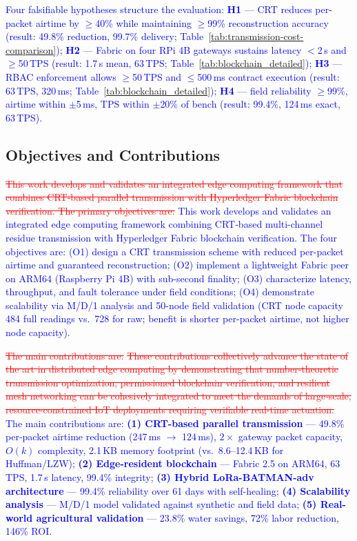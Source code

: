 \documentclass[pdflatex,sn-mathphys-num]{sn-jnl}
\theoremstyle{thmstyleone}
\theoremstyle{thmstyletwo}
\theoremstyle{thmstylethree}
\begin{document}
{\textcolor{blue}{Four falsifiable hypotheses structure the evaluation: \textbf{H1} — CRT reduces per-packet airtime by $\geq$40\% while maintaining $\geq$99\% reconstruction accuracy (result: 49.8\% reduction, 99.7\% delivery; Table~\ref{tab:transmission-cost-comparison}); \textbf{H2} — Fabric on four RPi 4B gateways sustains latency $<$2\,s and $\geq$50\,TPS (result: 1.7\,s mean, 63\,TPS; Table~\ref{tab:blockchain_detailed}); \textbf{H3} — RBAC enforcement allows $\geq$50\,TPS and $\leq$500\,ms contract execution (result: 63\,TPS, 320\,ms; Table~\ref{tab:blockchain_detailed}); \textbf{H4} — field reliability $\geq$99\%, airtime within $\pm$5\,ms, TPS within $\pm$20\% of bench (result: 99.4\%, 124\,ms exact, 63\,TPS).}

\subsection{Objectives and Contributions}
\label{subsec:objectives_contributions}

\textcolor{red}{\sout{This work develops and validates an integrated edge computing framework that combines CRT‑based parallel transmission with Hyperledger Fabric blockchain verification. The primary objectives are:}}
\textcolor{blue}{This work develops and validates an integrated edge computing framework combining CRT‑based multi-channel residue transmission with Hyperledger Fabric blockchain verification. The four objectives are: (O1) design a CRT transmission scheme with reduced per-packet airtime and guaranteed reconstruction; (O2) implement a lightweight Fabric peer on ARM64 (Raspberry Pi 4B) with sub-second finality; (O3) characterize latency, throughput, and fault tolerance under field conditions; (O4) demonstrate scalability via M/D/1 analysis and 50-node field validation (CRT node capacity 484 full readings vs.\ 728 for raw; benefit is shorter per-packet airtime, not higher node capacity).}

\textcolor{red}{\sout{The main contributions are:}}
\textcolor{red}{\sout{These contributions collectively advance the state of the art in distributed edge computing by demonstrating that number-theoretic transmission optimization, permissioned blockchain verification, and resilient mesh networking can be cohesively integrated to meet the demands of large‑scale, resource-constrained IoT deployments requiring verifiable real-time actuation.}}
\textcolor{blue}{The main contributions are: \textbf{(1) CRT-based parallel transmission} — 49.8\% per-packet airtime reduction (247\,ms $\to$ 124\,ms), $2\times$ gateway packet capacity, $O(k)$ complexity, 2.1\,KB memory footprint (vs.\ 8.6–12.4\,KB for Huffman/LZW); \textbf{(2) Edge-resident blockchain} — Fabric 2.5 on ARM64, 63\,TPS, 1.7\,s latency, 99.4\% integrity; \textbf{(3) Hybrid LoRa-BATMAN-adv architecture} — 99.4\% reliability over 61 days with self-healing; \textbf{(4) Scalability analysis} — M/D/1 model validated against synthetic and field data; \textbf{(5) Real-world agricultural validation} — 23.8\% water savings, 72\% labor reduction, 146\% ROI.}

}
\end{document}
